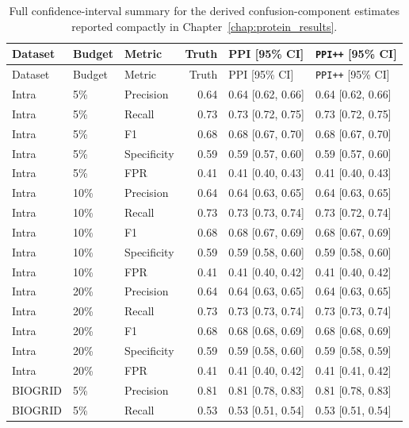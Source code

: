 \begingroup
\setlength{\LTleft}{\fill}
\setlength{\LTright}{\fill}
\small
\begin{longtable}{@{}lllrp{}p{}@{}}
\caption[Appendix summary of derived Chapter 5 confusion estimates]{Full confidence-interval summary for the derived confusion-component estimates reported compactly in Chapter~\ref{chap:protein_results}.}\label{tab:app_chap5_confusion_full}\\
\toprule
Dataset & Budget & Metric & Truth & PPI [95\% CI] & \texttt{PPI++} [95\% CI] \\
\midrule
\endfirsthead
\toprule
Dataset & Budget & Metric & Truth & PPI [95\% CI] & \texttt{PPI++} [95\% CI] \\
\midrule
\endhead
\bottomrule
\endfoot
Intra & 5\% & Precision & 0.64 & 0.64 [0.62, 0.66] & 0.64 [0.62, 0.66] \\
Intra & 5\% & Recall & 0.73 & 0.73 [0.72, 0.75] & 0.73 [0.72, 0.75] \\
Intra & 5\% & F1 & 0.68 & 0.68 [0.67, 0.70] & 0.68 [0.67, 0.70] \\
Intra & 5\% & Specificity & 0.59 & 0.59 [0.57, 0.60] & 0.59 [0.57, 0.60] \\
Intra & 5\% & FPR & 0.41 & 0.41 [0.40, 0.43] & 0.41 [0.40, 0.43] \\
Intra & 10\% & Precision & 0.64 & 0.64 [0.63, 0.65] & 0.64 [0.63, 0.65] \\
Intra & 10\% & Recall & 0.73 & 0.73 [0.73, 0.74] & 0.73 [0.72, 0.74] \\
Intra & 10\% & F1 & 0.68 & 0.68 [0.67, 0.69] & 0.68 [0.67, 0.69] \\
Intra & 10\% & Specificity & 0.59 & 0.59 [0.58, 0.60] & 0.59 [0.58, 0.60] \\
Intra & 10\% & FPR & 0.41 & 0.41 [0.40, 0.42] & 0.41 [0.40, 0.42] \\
Intra & 20\% & Precision & 0.64 & 0.64 [0.63, 0.65] & 0.64 [0.63, 0.65] \\
Intra & 20\% & Recall & 0.73 & 0.73 [0.73, 0.74] & 0.73 [0.73, 0.74] \\
Intra & 20\% & F1 & 0.68 & 0.68 [0.68, 0.69] & 0.68 [0.68, 0.69] \\
Intra & 20\% & Specificity & 0.59 & 0.59 [0.58, 0.60] & 0.59 [0.58, 0.59] \\
Intra & 20\% & FPR & 0.41 & 0.41 [0.40, 0.42] & 0.41 [0.41, 0.42] \\
BIOGRID & 5\% & Precision & 0.81 & 0.81 [0.78, 0.83] & 0.81 [0.78, 0.83] \\
BIOGRID & 5\% & Recall & 0.53 & 0.53 [0.51, 0.54] & 0.53 [0.51, 0.54] \\

\end{longtable}
